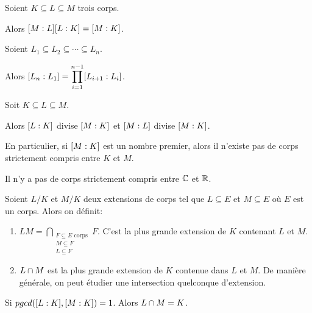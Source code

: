 \begin{proposition} 
	Soient $K \subseteq L \subseteq M$ trois corps.

	Alors
	$[M : L] [L : K] = [M : K]$.
\end{proposition}

\begin{proposition} 
	Soient $L_{1} \subseteq L_{2} \subseteq \cdots \subseteq L_{n}$.

	Alors $[L_{n} : L_{1}] =
	\displaystyle \prod_{i = 1}^{n - 1} [L_{i + 1} : L_{i}]$.
\end{proposition}

\begin{remarque}
	Soit $K \subseteq L \subseteq M$.

	Alors $[L : K]$ divise
	$[M : K]$ et $[M : L]$ divise
	$[M : K]$.

	En particulier, si $[M : K]$ est un
	nombre premier, alors il n'existe pas de corps strictement compris entre $K$
	et $M$.
\end{remarque}

\begin{exercice}
	Il n'y a pas de corps strictement compris entre $\mathbb{C}$ et $\mathbb{R}$.
\end{exercice}

\begin{definition}
	Soient $L/K$ et $M/K$ deux extensions de corps tel que $L \subseteq E$ et $M
	\subseteq E$ où $E$ est un corps. Alors on définit:

	\begin{enumerate}
		\item $LM = \displaystyle \bigcap_{\substack{F \subseteq E
				\text{ corps} \\ M \subseteq F \\ L \subseteq F}}
	F$. C'est la plus grande extension de $K$ contenant $L$ et $M$.
		\item $L \cap M$ est la plus grande extension de $K$ contenue dans $L$
			et $M$. De manière générale, on peut étudier une intersection
			quelconque d'extension.
	\end{enumerate}
\end{definition}

\begin{exercice}
	Si $pgcd([L : K], [M : K]) = 1$. Alors $L
	\cap M = K$.
\end{exercice}

